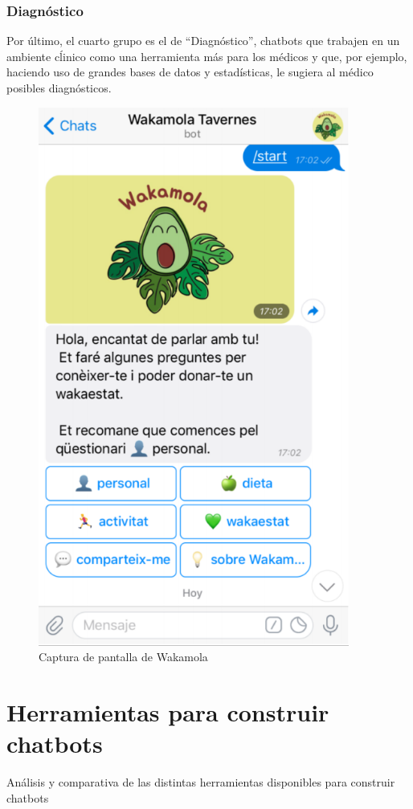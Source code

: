 \subsubsection{Diagnóstico}
Por último, el cuarto grupo es el de “Diagnóstico”, chatbots que trabajen en un ambiente cĺinico como una herramienta más para los médicos y que, por ejemplo,
haciendo uso de grandes bases de datos y estadísticas, le sugiera al médico posibles diagnósticos.\\

\begin{figure}[htbp]
\centering
\includegraphics[scale=0.5]{../images/wakamola.png} 
\caption{Captura de pantalla de Wakamola}
\label{fig:x captura wakamola}
\end{figure}

\section{Herramientas para construir chatbots}
Análisis y comparativa de las distintas herramientas disponibles para construir chatbots

